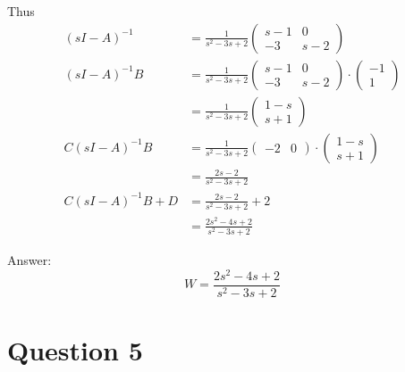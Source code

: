 \documentclass[12pt,letterpaper]{article}
\begin{document}
Thus
 \begin{align*}
    (sI - A)^{-1} &= \frac{1}{s^2-3s+2} \left( \begin{matrix} s-1 & 0 \\ -3 & s-2 \end{matrix} \right) \\
    (sI - A)^{-1}B &= \frac{1}{s^2-3s+2} \left( \begin{matrix} s-1 & 0 \\ -3 & s-2 \end{matrix} \right) \cdot \left( \begin{matrix} -1 \\ 1 \end{matrix} \right) \\
    &= \frac{1}{s^2-3s+2} \left( \begin{matrix} 1-s \\ s+1 \end{matrix} \right) \\
    C(sI - A)^{-1}B &= \frac{1}{s^2-3s+2} \left( \begin{matrix} -2 & 0 \end{matrix} \right) \cdot
    \left( \begin{matrix} 1-s \\ s+1 \end{matrix} \right) \\
    &= \frac{2s - 2}{s^2-3s+2} \\
    C(sI - A)^{-1}B + D &= \frac{2s - 2}{s^2-3s+2} + 2 \\
    &= \frac{2s^2-4s+2}{s^2-3s+2}
 \end{align*}
 
 Answer: 
 \begin{equation*}
     W=\frac{2s^2-4s+2}{s^2-3s+2}
 \end{equation*}
 
\section*{Question 5}
\label{Q:5}
\end{document}

